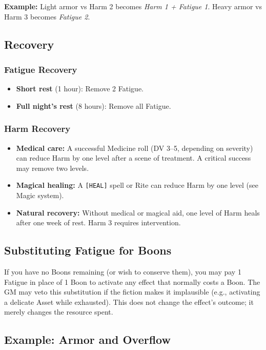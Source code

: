 \textbf{Example:} Light armor vs Harm 2 becomes \textit{Harm 1 + Fatigue 1}. Heavy armor vs Harm 3 becomes \textit{Fatigue 2}.

\subsection{Recovery}

\subsubsection{Fatigue Recovery}
\begin{itemize}
  \item \textbf{Short rest} (1 hour): Remove 2 Fatigue.
  \item \textbf{Full night's rest} (8 hours): Remove all Fatigue.
\end{itemize}

\subsubsection{Harm Recovery}
\begin{itemize}
  \item \textbf{Medical care:} A successful Medicine roll (DV 3–5, depending on severity) can reduce Harm by one level after a scene of treatment. A critical success may remove two levels.
  \item \textbf{Magical healing:} A \texttt{[HEAL]} spell or Rite can reduce Harm by one level (see Magic system).
  \item \textbf{Natural recovery:} Without medical or magical aid, one level of Harm heals after one week of rest. Harm 3 requires intervention.
\end{itemize}

\subsection{Substituting Fatigue for Boons}

If you have no Boons remaining (or wish to conserve them), you may pay 1 Fatigue in place of 1 Boon to activate any effect that normally costs a Boon. The GM may veto this substitution if the fiction makes it implausible (e.g., activating a delicate Asset while exhausted). This does not change the effect's outcome; it merely changes the resource spent.

\subsection{Example: Armor and Overflow}

